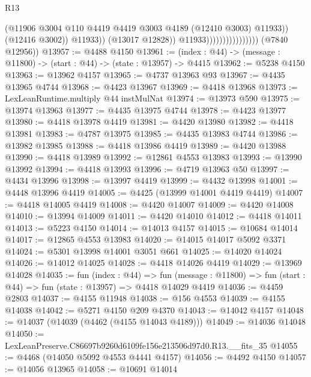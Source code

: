 \begin{lexlean}{R13}
\begin{coremodule}
                                                (@11906
                                                  @3004
                                                  @110
                                                  @4419
                                                  @4419
                                                  @3003
                                                  @4189
                                                  (@12410 @3003)
                                                  @11933))
                                              (@12416 @3002))
                                            @11933))
                                        (@13017 @12828))
                                      @11933))))))))))))))))
      (@7840 @12956))
@13957 := @4488 @4150
@13961 := (index : @44) -> (message : @11800) -> (start : @44) -> (state : @13957) -> @4415
@13962 := @5238 @4150
@13963 := @13962 @4157
@13965 := @4737 @13963 @93
@13967 := @4435 @13965 @4744
@13968 := @4423 @13967
@13969 := @4418 @13968
@13973 := LexLeanRuntime.multiply @44 instMulNat
@13974 := @13973 @590
@13975 := @13974 @13963
@13977 := @4435 @13975 @4744
@13978 := @4423 @13977
@13980 := @4418 @13978 @4419
@13981 := @4420 @13980
@13982 := @4418 @13981
@13983 := @4787 @13975
@13985 := @4435 @13983 @4744
@13986 := @13982 @13985
@13988 := @4418 @13986 @4419
@13989 := @4420 @13988
@13990 := @4418 @13989
@13992 := @12861 @4553 @13983
@13993 := @13990 @13992
@13994 := @4418 @13993
@13996 := @4719 @13963 @50
@13997 := @4434 @13996
@13998 := @13997 @4419
@13999 := @4432 @13998
@14001 := @4448 @13996 @4419
@14005 := @4425 (@13999 @14001 @4419 @4419)
@14007 := @4418 @14005 @4419
@14008 := @4420 @14007
@14009 := @4420 @14008
@14010 := @13994 @14009
@14011 := @4420 @14010
@14012 := @4418 @14011
@14013 := @5223 @4150
@14014 := @14013 @4157
@14015 := @10684 @14014
@14017 := @12865 @4553 @13983
@14020 := @14015 @14017 @5092 @3371
@14024 := @5301 @13998 @14001 @3051 @661
@14025 := @14020 @14024
@14026 := @14012 @14025
@14028 := @4418 @14026 @4419
@14029 := @13969 @14028
@14035 := fun (index : @44) =>
  fun (message : @11800) => fun (start : @44) => fun (state : @13957) => @4418 @14029 @4419
@14036 := @4459 @2803
@14037 := @4155 @11948
@14038 := @156 @4553
@14039 := @4155 @14038
@14042 := @5271 @4150 @209 @4370
@14043 := @14042 @4157
@14048 := @14037 (@14039 (@4462 (@4155 @14043 @4189)))
@14049 := @14036 @14048
@14050 := LexLeanPreserve.C86697b9260d6109fe156e213506d97d0.R13.__fits_35
@14055 := @4468 (@14050 @5092 @4553 @4441 @4157)
@14056 := @4492 @4150
@14057 := @14056 @13965
@14058 := @10691 @14014

\end{coremodule}
\end{lexlean}
